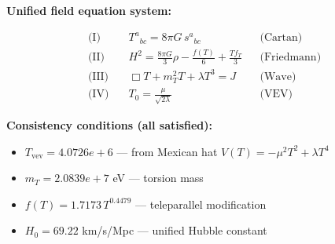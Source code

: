 
\textbf{Unified field equation system:}

\begin{align}
  \text{(I)} \quad & T^a{}_{bc} = 8\pi G \, s^a{}_{bc} && \text{(Cartan)} \\
  \text{(II)} \quad & H^2 = \frac{8\pi G}{3}\rho - \frac{f(T)}{6} + \frac{Tf_T}{3} && \text{(Friedmann)} \\
  \text{(III)} \quad & \Box T + m_T^2 T + \lambda T^3 = J && \text{(Wave)} \\
  \text{(IV)} \quad & T_0 = \frac{\mu}{\sqrt{2\lambda}} && \text{(VEV)}
\end{align}

\textbf{Consistency conditions (all satisfied):}
\begin{itemize}
  \item $T_{\text{vev}} = 4.0726e+6$ — from Mexican hat $V(T) = -\mu^2 T^2 + \lambda T^4$
  \item $m_T = 2.0839e+7$ eV — torsion mass
  \item $f(T) = 1.7173 \, T^{0.4479}$ — teleparallel modification
  \item $H_0 = 69.22$ km/s/Mpc — unified Hubble constant
\end{itemize}